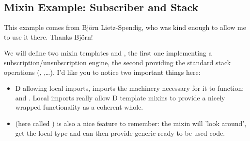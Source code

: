 
\subsection{Mixin Example: Subscriber and Stack}

This example comes from Bj\"{o}rn Lietz-Spendig, who was kind enough to allow me to use it there. Thanks Bj\"{o}rn!

We will define two mixin templates  and , the first one implementing a subscription/unsubscription engine, the second providing the standard stack operations (, ,\ldots). I'd like you to notice two important things here:

\begin{itemize}
\item D allowing local imports,  imports the machinery necessary for it to function:  and . Local imports really allow D template mixins to provide a nicely wrapped functionality as a coherent whole.
\item {}\DD{(}\DD{)} (here called ) is also a nice feature to remember: the mixin will 'look around', get the local  type and can then provide generic ready-to-be-used code.
\end{itemize}

